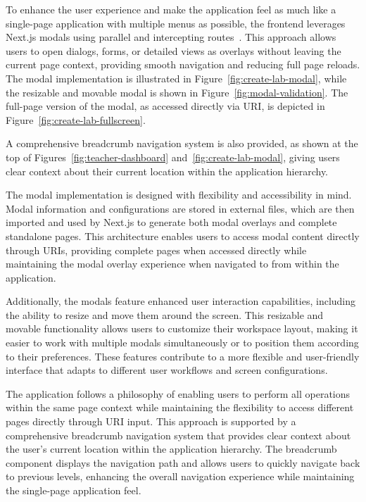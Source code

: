 To enhance the user experience and make the application feel as much like a single-page application with multiple menus as possible, the frontend leverages Next.js modals using parallel and intercepting routes~\cite{nextjs-app-router}. This approach allows users to open dialogs, forms, or detailed views as overlays without leaving the current page context, providing smooth navigation and reducing full page reloads. The modal implementation is illustrated in Figure~\ref{fig:create-lab-modal}, while the resizable and movable modal is shown in Figure~\ref{fig:modal-validation}. The full-page version of the modal, as accessed directly via URI, is depicted in Figure~\ref{fig:create-lab-fullscreen}.

A comprehensive breadcrumb navigation system is also provided, as shown at the top of Figures~\ref{fig:teacher-dashboard} and~\ref{fig:create-lab-modal}, giving users clear context about their current location within the application hierarchy.

The modal implementation is designed with flexibility and accessibility in mind. Modal information and configurations are stored in external files, which are then imported and used by Next.js to generate both modal overlays and complete standalone pages. This architecture enables users to access modal content directly through URIs, providing complete pages when accessed directly while maintaining the modal overlay experience when navigated to from within the application.

Additionally, the modals feature enhanced user interaction capabilities, including the ability to resize and move them around the screen. This resizable and movable functionality allows users to customize their workspace layout, making it easier to work with multiple modals simultaneously or to position them according to their preferences. These features contribute to a more flexible and user-friendly interface that adapts to different user workflows and screen configurations.

The application follows a philosophy of enabling users to perform all operations within the same page context while maintaining the flexibility to access different pages directly through URI input. This approach is supported by a comprehensive breadcrumb navigation system that provides clear context about the user's current location within the application hierarchy. The breadcrumb component displays the navigation path and allows users to quickly navigate back to previous levels, enhancing the overall navigation experience while maintaining the single-page application feel.

